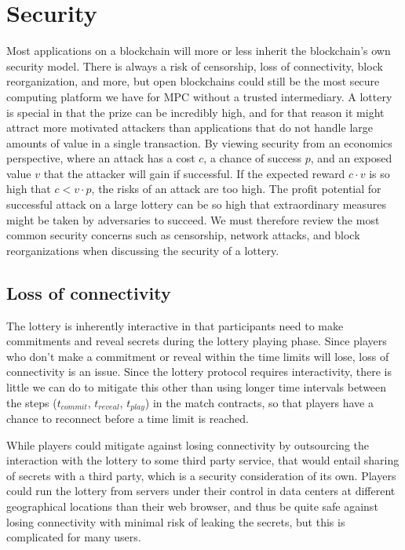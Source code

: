 \section{Security}
\label{sec:security}

Most applications on a blockchain will more or less inherit the blockchain's own security model. There is always a risk of censorship, loss of connectivity, block reorganization, and more, but open blockchains could still be the most secure computing platform we have for MPC without a trusted intermediary. A lottery is special in that the prize can be incredibly high, and for that reason it might attract more motivated attackers than applications that do not handle large amounts of value in a single transaction. By viewing security from an economics perspective, where an attack has a cost $c$, a chance of success $p$, and an exposed value $v$ that the attacker will gain if successful. If the expected reward $c \cdot v$ is so high that $c < v \cdot p$, the risks of an attack are too high. The profit potential for successful attack on a large lottery can be so high that extraordinary measures might be taken by adversaries to succeed. We must therefore review the most common security concerns such as censorship, network attacks, and block reorganizations when discussing the security of a lottery. 

\subsection{Loss of connectivity}
The lottery is inherently interactive in that participants need to make commitments and reveal secrets during the lottery playing phase. Since players who don't make a commitment or reveal within the time limits will lose, loss of connectivity is an issue. Since the lottery protocol requires interactivity, there is little we can do to mitigate this other than using longer time intervals between the steps ($t_{commit}$, $t_{reveal}$, $t_{play}$) in the match contracts, so that players have a chance to reconnect before a time limit is reached.

While players could mitigate against losing connectivity by outsourcing the interaction with the lottery to some third party service, that would entail sharing of secrets with a third party, which is a security consideration of its own. Players could run the lottery from servers under their control in data centers at different geographical locations than their web browser, and thus be quite safe against losing connectivity with minimal risk of leaking the secrets, but this is complicated for many users. 

